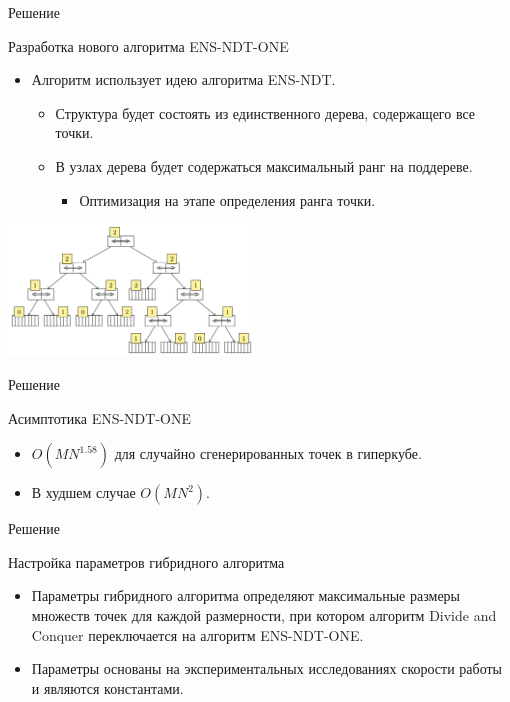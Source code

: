 \documentclass[table]{beamer}
\begin{document}
\begin{frame}{Решение}
\begin{block}{Разработка нового алгоритма ENS-NDT-ONE}
\begin{itemize}
\item Алгоритм использует идею алгоритма ENS-NDT.
\begin{itemize}
\item Структура будет состоять из единственного дерева, содержащего все точки.
\item В узлах дерева будет содержаться максимальный ранг на поддереве.
\begin{itemize}
  \item Оптимизация на этапе определения ранга точки.
\end{itemize}
\end{itemize}
\end{itemize}
\begin{center}
\includegraphics*[height=3.5cm]{pic/ndtree_new.png}
\end{center}
\end{block}
\end{frame}

\begin{frame}{Решение}
\begin{block}{Асимптотика ENS-NDT-ONE}
\begin{itemize}
\item $O(MN^{1.58})$ для случайно сгенерированных точек в гиперкубе.
\item В худшем случае $O(MN^{2})$.
\end{itemize}
\end{block}
\end{frame}

\begin{frame}{Решение}
\begin{block}{Настройка параметров гибридного алгоритма}
\begin{itemize}
\item Параметры гибридного алгоритма определяют максимальные размеры множеств точек для каждой размерности, при котором алгоритм Divide and Conquer переключается на алгоритм ENS-NDT-ONE.
\item Параметры основаны на экспериментальных исследованиях скорости работы и являются константами.
\end{itemize}
\end{block}
\end{frame}
\end{document}
